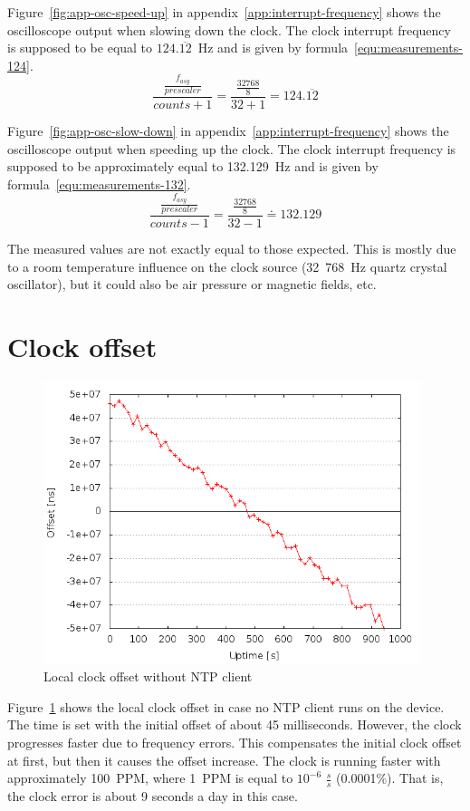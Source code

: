 Figure~\ref{fig:app-osc-speed-up} in appendix~\ref{app:interrupt-frequency} shows the oscilloscope output
when slowing down the clock.
The clock interrupt frequency
is supposed to be equal to $124.\overline{12}$~Hz and is given by formula~\ref{equ:measurements-124}.
\begin{equation}
\label{equ:measurements-124}
\frac{\frac{f_{asy}}{prescaler}}{counts + 1} = \frac{\frac{32768}{8}}{32+1} = 124.\overline{12}
\end{equation}

Figure~\ref{fig:app-osc-slow-down} in appendix~\ref{app:interrupt-frequency} shows the oscilloscope output
when speeding up the clock.
The clock interrupt frequency
is supposed to be approximately equal to 132.129~Hz and is given by formula~\ref{equ:measurements-132}.
\begin{equation}
\label{equ:measurements-132}
\frac{\frac{f_{asy}}{prescaler}}{counts - 1} = \frac{\frac{32768}{8}}{32-1} \doteq 132.129
\end{equation}

The measured values are not exactly equal to those expected.
This is mostly due to a room temperature influence on the clock source
(32~768~Hz quartz crystal oscillator),
but it could also be air pressure or magnetic fields, etc.

\section{Clock offset}
\begin{figure}[H]
  \centering
  \includegraphics[width=11cm,keepaspectratio]{fig/no-ntp.png}
  \caption{Local clock offset without NTP client}
  \label{fig:measurements-no-ntp}
\end{figure}
Figure~\ref{fig:measurements-no-ntp} shows the local clock offset
in case no NTP client runs on the device.
The time is set with the initial offset of about 45 milliseconds.
However, the clock progresses faster due to frequency errors.
This compensates the initial clock offset at first,
but then it causes the offset increase.
The clock is running faster with approximately 100~PPM,
where 1~PPM is equal to $10^{-6}$ $\frac{s}{s}$ (0.0001\%).
That is, the clock error is about 9 seconds a day in this case.

